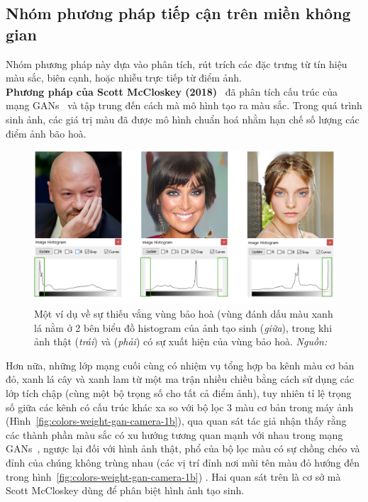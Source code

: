 \subsection{Nhóm phương pháp tiếp cận trên miền không gian}
Nhóm phương pháp này dựa vào phân tích, rút trích các đặc trưng từ tín hiệu màu sắc, biên cạnh, hoặc nhiễu trực tiếp từ điểm ảnh.\\
\textbf{Phương pháp của Scott McCloskey (2018)}~\cite{8803661} đã phân tích cấu trúc của mạng GANs~\cite{Goodfellow2014GenerativeAN} và tập trung đến cách mà mô hình tạo ra màu sắc. Trong quá trình sinh ảnh, các giá trị màu đã được mô hình chuẩn hoá nhằm hạn chế số lượng các điểm ảnh bão hoà\footnotemark{}.
%
\begin{figure}[h]
	\centering
	\includegraphics[width=0.9\linewidth]{Images/histograms-gan-real-1.png}
	\caption{
		Một ví dụ về sự thiếu vắng vùng bảo hoà (vùng đánh dấu màu xanh lá nằm ở 2 bên biểu đồ \gls{histogram} của ảnh tạo sinh (\textit{giữa}), trong khi ảnh thật (\textit{trái}) và (\textit{phải}) có sự xuất hiện của vùng bảo hoà. \textit{Nguồn: \cite{8803661}}
		}
	\label{fig:histograms-gan-real-1}
\end{figure}
%
Hơn nữa, những lớp mạng cuối cùng có nhiệm vụ tổng hợp ba kênh màu cơ bản đỏ, xanh lá cây và xanh lam từ một ma trận nhiều chiều bằng cách sử dụng các lớp tích chập (cùng một bộ trọng số cho tất cả điểm ảnh), tuy nhiên tỉ lệ trọng số giữa các kênh có cấu trúc khác xa so với bộ lọc 3 màu cơ bản trong máy ảnh (Hình~\ref{fig:colors-weight-gan-camera-1b}), qua quan sát tác giả nhận thấy rằng các thành phần màu sắc có xu hướng tương quan mạnh với nhau trong mạng GANs~\cite{Goodfellow2014GenerativeAN}, ngược lại đối với hình ảnh thật, phổ của bộ lọc màu có sự chồng chéo và đỉnh của chúng không trùng nhau (các vị trí đỉnh nơi mũi tên màu đỏ hướng đến trong hình~\ref{fig:colors-weight-gan-camera-1b}) . Hai quan sát trên là cơ sở mà Scott McCloskey dùng để phân biệt hình ảnh tạo sinh.
